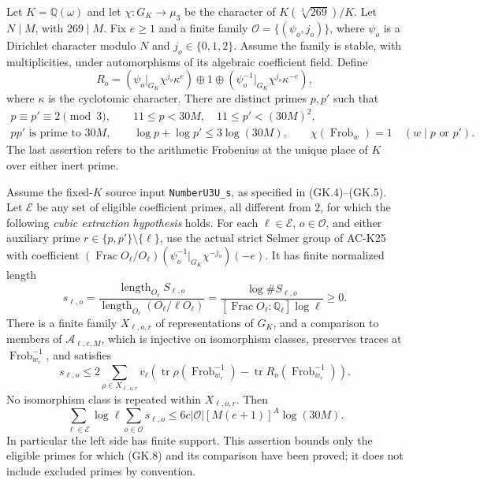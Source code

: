 \begin{proposition}
\label{AC-K29}
Let $K=\mathbb Q(\omega)$ and let
$\chi:G_K\to\mu_3$ be the character of
$K(\sqrt[3]{269})/K$.  Let $N\mid M$, with $269\mid M$.
Fix $e\ge1$ and a finite family
$\mathcal O=\{(\psi_o,j_o)\}$, where $\psi_o$ is a Dirichlet
character modulo $N$ and $j_o\in\{0,1,2\}$.
Assume the family is stable, with multiplicities, under automorphisms
of its algebraic coefficient field.  Define
\[
 R_o=(\psi_o|_{G_K}\chi^{j_o}\kappa^e)
       \oplus1\oplus
       (\psi_o^{-1}|_{G_K}\chi^{j_o}\kappa^{-e}),              \tag{GK.6}
\]
where $\kappa$ is the cyclotomic character.
There are distinct primes $p,p'$ such that
\[
 \begin{gathered}
 p\equiv p'\equiv2\pmod3,
 \qquad11\le p<30M,\quad11\le p'<(30M)^2,\\
 pp'\text{ is prime to }30M,
 \qquad\log p+\log p'\le3\log(30M),\qquad
 \chi(\operatorname{Frob}_w)=1\quad(w\mid p\text{ or }p').
 \end{gathered}                                                \tag{GK.7}
\]
The last assertion refers to the arithmetic Frobenius at the unique
place of $K$ over either inert prime.

Assume the fixed-$K$ source input \texttt{NumberU3U\_s}, as
specified in (GK.4)--(GK.5).  Let $\mathcal E$ be any set of
eligible coefficient primes, all different from $2$, for which
the following \emph{cubic extraction hypothesis} holds.
For each $\ell\in\mathcal E$, $o\in\mathcal O$, and either
auxiliary prime $r\in\{p,p'\}\setminus\{\ell\}$, use the actual
strict Selmer group of AC-K25 with coefficient
$(\operatorname{Frac}O_\ell/O_\ell)
 (\psi_o^{-1}|_{G_K}\chi^{-j_o})(-e)$.
It has finite normalized length
\[
 s_{\ell,o}=\frac{\operatorname{length}_{O_\ell}S_{\ell,o}}
                   {\operatorname{length}_{O_\ell}(O_\ell/\ell O_\ell)}
       =\frac{\log\#S_{\ell,o}}{[\operatorname{Frac}O_\ell:
                              \mathbb Q_\ell]\log\ell}\ge0.
                                                               \tag{GK.8a}
\]
There is a finite family $X_{\ell,o,r}$
of representations of $G_K$, and a comparison to members of
$\mathcal A_{\ell,e,M}$, which is injective on isomorphism
classes, preserves traces at $\operatorname{Frob}_{w_r}^{-1}$,
and satisfies
\[
 s_{\ell,o}\le2\sum_{\rho\in X_{\ell,o,r}}v_\ell
  \left(\operatorname{tr}\rho(\operatorname{Frob}_{w_r}^{-1})
             -\operatorname{tr}R_o(\operatorname{Frob}_{w_r}^{-1})\right).
                                                               \tag{GK.8}
\]
No isomorphism class is repeated within $X_{\ell,o,r}$.
Then
\[
 \sum_{\ell\in\mathcal E}\log\ell\sum_{o\in\mathcal O}s_{\ell,o}
   \le6c|\mathcal O|[M(e+1)]^A\log(30M).                     \tag{GK.9}
\]
In particular the left side has finite support.  This assertion
bounds only the eligible primes for which (GK.8) and its comparison
have been proved; it does not include excluded primes by convention.
\end{proposition}
